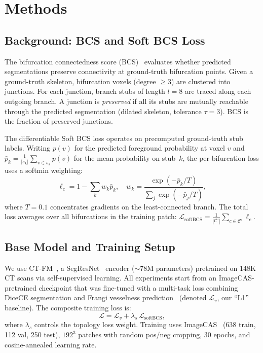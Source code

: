 \documentclass[runningheads]{llncs}
\begin{document}
\section{Methods}

\subsection{Background: BCS and Soft BCS Loss}
\label{sec:bcs}

The bifurcation connectedness score (BCS)~\cite{anonymous_bcs_2026} evaluates whether predicted segmentations preserve connectivity at ground-truth bifurcation points.
Given a ground-truth skeleton, bifurcation voxels (degree ${\geq}3$) are clustered into junctions.
For each junction, branch stubs of length $l{=}8$ are traced along each outgoing branch.
A junction is \emph{preserved} if all its stubs are mutually reachable through the predicted segmentation (dilated skeleton, tolerance $\tau{=}3$).
BCS is the fraction of preserved junctions.

The differentiable Soft BCS loss operates on precomputed ground-truth stub labels.
Writing $p(v)$ for the predicted foreground probability at voxel $v$ and $\bar{p}_k = \frac{1}{|s_k|}\sum_{v \in s_k} p(v)$ for the mean probability on stub~$k$, the per-bifurcation loss uses a softmin weighting:
\begin{equation}\label{eq:softbcs}
\ell_c = 1 - \sum_k w_k \bar{p}_k, \quad
w_k = \frac{\exp(-\bar{p}_k/T)}{\sum_j \exp(-\bar{p}_j/T)},
\end{equation}
where $T{=}0.1$ concentrates gradients on the least-connected branch.
The total loss averages over all bifurcations in the training patch:
$\mathcal{L}_{\mathrm{softBCS}} = \frac{1}{|\mathcal{C}'|}\sum_{c \in \mathcal{C}'} \ell_c$.

\subsection{Base Model and Training Setup}

We use CT-FM~\cite{pai_ctfm_2025}, a SegResNet~\cite{myronenko_segresnet_2019} encoder (${\sim}$78M parameters) pretrained on 148K CT scans via self-supervised learning.
All experiments start from an ImageCAS-pretrained checkpoint that was fine-tuned with a multi-task loss combining DiceCE segmentation and Frangi vesselness prediction~\cite{frangi_multiscale_1998} (denoted $\mathcal{L}_v$, our ``L1'' baseline).
The composite training loss is:
\begin{equation}\label{eq:loss}
\mathcal{L} = \mathcal{L}_v + \lambda_s \, \mathcal{L}_{\mathrm{softBCS}},
\end{equation}
where $\lambda_s$ controls the topology loss weight.
Training uses ImageCAS~\cite{zeng_imagecas_2023} (638 train, 112 val, 250 test), $192^3$ patches with random pos/neg cropping, 30 epochs, and cosine-annealed learning rate.
\end{document}
